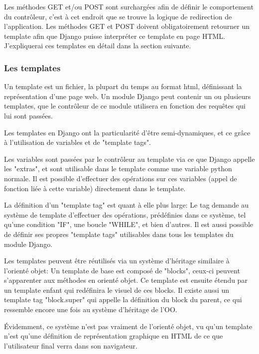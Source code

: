 \documentclass[12pt,table,a4paper]{report}
\begin{document}
Les méthodes GET et/ou POST sont surchargées afin de définir le comportement du contrôleur, c'est à cet endroit que se trouve la logique de redirection de l'application. Les méthodes GET et POST doivent obligatoirement retourner un template afin que Django puisse interpréter ce template en page HTML. J'expliquerai ces templates en détail dans la section suivante.

\subsubsection{Les templates}
Un template est un fichier, la plupart du temps au format html, définissant la représentation d'une page web. Un module Django peut contenir un ou plusieurs templates, que le contrôleur de ce module utilisera en fonction des requêtes qui lui sont passées.

Les templates en Django ont la particularité d'être semi-dynamiques, et ce grâce à l'utilisation de variables et de "template tags".

Les variables sont passées par le contrôleur au template via ce que Django appelle les "extras", et sont utilisable dans le template comme une variable python normale. Il est possible d'effectuer des opérations sur ces variables (appel de fonction liée à cette variable) directement dans le template.

La définition d'un "template tag" est quant à elle plus large: Le tag demande au système de template d'effectuer des opérations, prédéfinies dans ce système, tel qu'une condition "IF", une boucle "WHILE", et bien d'autres. Il est aussi possible de définir ses propres "template tags" utilisables dans tous les templates du module Django.

Les templates peuvent être réutilisés via un système d'héritage similaire à l'orienté objet: Un template de base est composé de "blocks", ceux-ci peuvent s'apparenter aux méthodes en orienté objet. Ce template est ensuite étendu par un template enfant qui redéfinira le visuel de ces blocks. Il existe aussi un template tag "block.super" qui appelle la définition du block du parent, ce qui ressemble encore une fois au système d'héritage de l'OO.

Évidemment, ce système n'est pas vraiment de l'orienté objet, vu qu'un template n'est qu'une définition de représentation graphique en HTML de ce que l'utilisateur final verra dans son navigateur.

\end{document}
